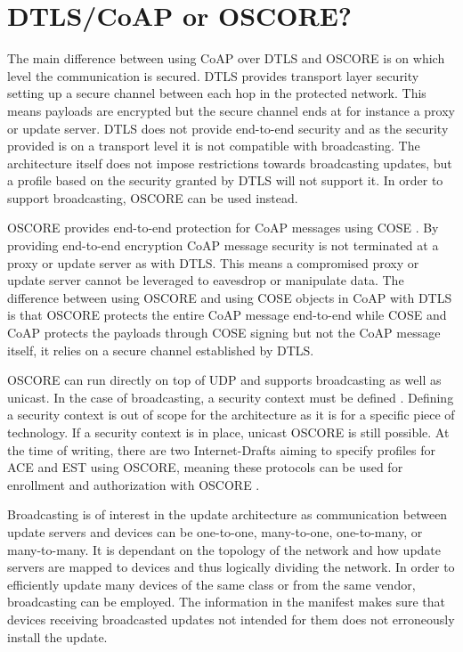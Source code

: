 \documentclass[0-thesis.tex]{subfiles}
\begin{document}
\section{DTLS/CoAP or OSCORE?}
\label{sec:dtls-coap-or-oscore}
The main difference between using CoAP over DTLS and OSCORE is on which level the
communication is secured. DTLS provides transport layer security setting up a secure
channel between each hop in the protected network. This means payloads are encrypted but
the secure channel ends at for instance a proxy or update server. DTLS does not provide
end-to-end security and as the security provided is on a transport level it is not
compatible with broadcasting. The architecture itself does not impose restrictions towards
broadcasting updates, but a profile based on the security granted by DTLS will not support
it. In order to support broadcasting, OSCORE can be used instead.

OSCORE provides end-to-end protection for CoAP messages using COSE \parencite{oscore}. By
providing end-to-end encryption CoAP message security is not terminated at a proxy or
update server as with DTLS. This means a compromised proxy or update server cannot be
leveraged to eavesdrop or manipulate data. The difference between using OSCORE and using
COSE objects in CoAP with DTLS is that OSCORE protects the entire CoAP message end-to-end
while COSE and CoAP protects the payloads through COSE signing but not the CoAP message
itself, it relies on a secure channel established by DTLS.

OSCORE can run directly on top of UDP and supports broadcasting as well as unicast. In the
case of broadcasting, a security context must be defined \parencite{oscore-group}.
Defining a security context is out of scope for the architecture as it is for a specific
piece of technology. If a security context is in place, unicast OSCORE is still possible.
At the time of writing, there are two Internet-Drafts aiming to specify profiles for ACE
and EST using OSCORE, meaning these protocols can be used for enrollment and authorization
with OSCORE \parencite{ace-oscore, est-oscore}.

Broadcasting is of interest in the update architecture as communication between update
servers and devices can be one-to-one, many-to-one, one-to-many, or many-to-many. It is
dependant on the topology of the network and how update servers are mapped to devices and
thus logically dividing the network. In order to efficiently update many devices of the
same class or from the same vendor, broadcasting can be employed. The information in the
manifest makes sure that devices receiving broadcasted updates not intended for them does
not erroneously install the update.
\end{document}
